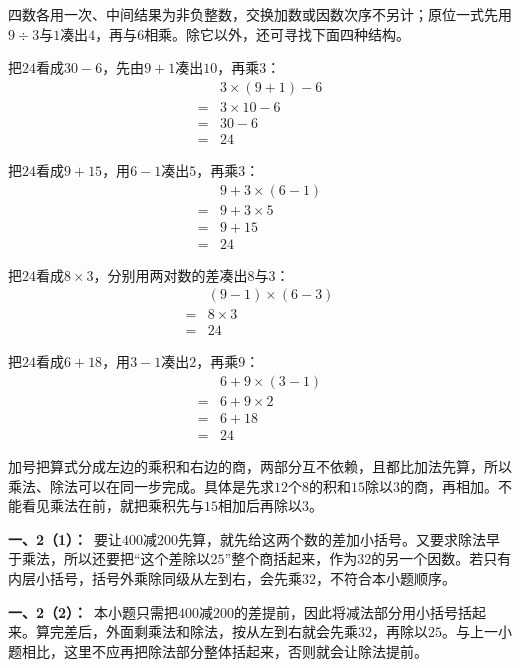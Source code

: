 \documentclass[multi=snippet,border=0pt]{standalone}
\newenvironment{snippet}[3]{\begin{minipage}{#1bp}\color{answerred}\fontsize{#2}{#3}\selectfont\raggedright}{\end{minipage}}
\begin{document}
\begin{snippet}{505}{11.5}{14}四数各用一次、中间结果为非负整数，交换加数或因数次序不另计；原位一式先用\(9\div3\)与\(1\)凑出\(4\)，再与\(6\)相乘。除它以外，还可寻找下面四种结构。\par 把\(24\)看成\(30-6\)，先由\(9+1\)凑出\(10\)，再乘\(3\)：\[\begin{aligned}&3\times(9+1)-6\\={}&3\times10-6\\={}&30-6\\={}&24\end{aligned}\]\par 把\(24\)看成\(9+15\)，用\(6-1\)凑出\(5\)，再乘\(3\)：\[\begin{aligned}&9+3\times(6-1)\\={}&9+3\times5\\={}&9+15\\={}&24\end{aligned}\]\par 把\(24\)看成\(8\times3\)，分别用两对数的差凑出\(8\)与\(3\)：\[\begin{aligned}&(9-1)\times(6-3)\\={}&8\times3\\={}&24\end{aligned}\]\par 把\(24\)看成\(6+18\)，用\(3-1\)凑出\(2\)，再乘\(9\)：\[\begin{aligned}&6+9\times(3-1)\\={}&6+9\times2\\={}&6+18\\={}&24\end{aligned}\]\end{snippet}
\begin{snippet}{505}{11.5}{14}加号把算式分成左边的乘积和右边的商，两部分互不依赖，且都比加法先算，所以乘法、除法可以在同一步完成。具体是先求\(12\)个\(8\)的积和\(15\)除以\(3\)的商，再相加。不能看见乘法在前，就把乘积先与\(15\)相加后再除以\(3\)。\end{snippet}
\begin{snippet}{505}{11.5}{14}\textbf{一、2（1）：}\ 要让\(400\)减\(200\)先算，就先给这两个数的差加小括号。又要求除法早于乘法，所以还要把“这个差除以\(25\)”整个商括起来，作为\(32\)的另一个因数。若只有内层小括号，括号外乘除同级从左到右，会先乘\(32\)，不符合本小题顺序。\end{snippet}
\begin{snippet}{505}{11.5}{14}\textbf{一、2（2）：}\ 本小题只需把\(400\)减\(200\)的差提前，因此将减法部分用小括号括起来。算完差后，外面剩乘法和除法，按从左到右就会先乘\(32\)，再除以\(25\)。与上一小题相比，这里不应再把除法部分整体括起来，否则就会让除法提前。\end{snippet}
\end{document}
